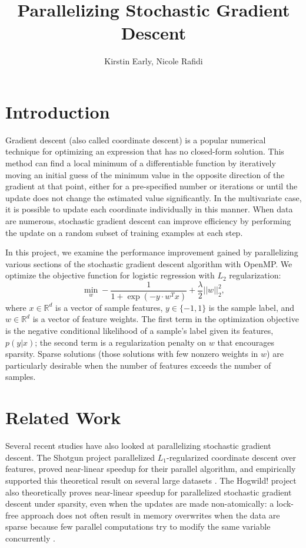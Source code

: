 \documentclass{article}
\title{Parallelizing Stochastic Gradient Descent}
\author{Kirstin Early, \qquad Nicole Rafidi}
\begin{document}
\maketitle

\section{Introduction}
Gradient descent (also called coordinate descent) is a popular numerical technique for optimizing an expression that has no closed-form solution. This method can find a local minimum of a differentiable function by iteratively moving an initial guess of the minimum value in the opposite direction of the gradient at that point, either for a pre-specified number or iterations or until the update does not change the estimated value significantly. In the multivariate case, it is possible to update each coordinate individually in this manner. When data are numerous, stochastic gradient descent can improve efficiency by performing the update on a random subset of training examples at each step. %

In this project, we examine the performance improvement gained by parallelizing various sections of the stochastic gradient descent algorithm with OpenMP. We optimize the objective function for logistic regression with $L_2$ regularization:
\begin{equation}
\underset{w}{\min}-\frac{1}{1 + \exp(-y \cdot w^T x)} + \frac{\lambda}{2}||w||^2_2,
\end{equation}
where $x \in \mathbb{R}^d$ is a vector of sample features, $y \in \lbrace -1, 1 \rbrace$ is the sample label, and $w \in \mathbb{R}^d$ is a vector of feature weights. The first term in the optimization objective is the negative conditional likelihood of a sample's label given its features, $p(y|x)$; the second term is a regularization penalty on $w$ that encourages sparsity. %
 Sparse solutions (those solutions with few nonzero weights in $w$) are particularly desirable when the number of features exceeds the number of samples.

\section{Related Work}
Several recent studies have also looked at parallelizing stochastic gradient descent. The Shotgun project parallelized $L_1$-regularized coordinate descent over features, proved near-linear speedup for their parallel algorithm, and empirically supported this theoretical result on several large datasets \cite{shotgun2011}. The Hogwild! project also theoretically proves near-linear speedup for parallelized stochastic gradient descent under sparsity, even when the updates are made non-atomically: a lock-free approach does not often result in memory overwrites when the data are sparse because few parallel computations try to modify the same variable concurrently \cite{hogwild2011}.
\end{document}
